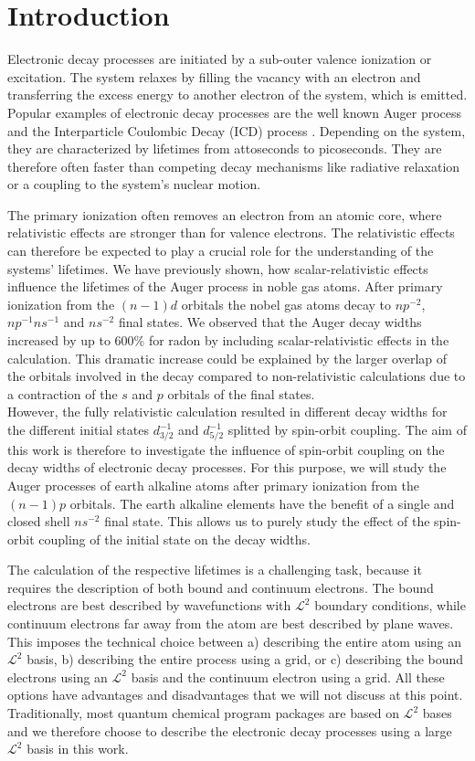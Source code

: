\section{Introduction}
Electronic decay processes are initiated by a sub-outer valence ionization
or excitation. The system relaxes by filling the vacancy with an electron and
transferring the excess energy to another electron of the system, which is emitted.
Popular examples of electronic decay processes are the
well known Auger process \cite{Meitner22} and the Interparticle
Coulombic Decay (ICD) process \cite{Cederbaum97}.
Depending on the system, they are characterized by lifetimes from attoseconds
to picoseconds. They are therefore often faster than competing decay mechanisms
like radiative relaxation or a coupling to the system's nuclear motion.

The primary ionization often removes an electron from an atomic core, where
relativistic effects are stronger than for valence electrons. The relativistic
effects can therefore be expected to play a crucial role for the understanding
of the systems' lifetimes. We have previously shown, how
scalar-relativistic effects influence the lifetimes of the Auger process in
noble gas atoms. After primary ionization from the $(n-1)d$ orbitals the nobel
gas atoms decay to $np^{-2}$, $np^{-1}ns^{-1}$ and $ns^{-2}$ final states.
We observed that the Auger decay widths increased by up to 600\% for radon
by including scalar-relativistic effects in the calculation. This
dramatic increase could be explained by the larger overlap of the orbitals
involved in the decay compared to non-relativistic calculations due to
a contraction of the $s$ and $p$ orbitals of the final states.\\
However, the fully relativistic calculation resulted in different decay widths
for the different initial states $d_{3/2}^{-1}$ and $d_{5/2}^{-1}$ splitted by
spin-orbit coupling. The aim of this work is therefore to investigate the
influence of spin-orbit coupling on the decay widths of electronic decay processes.
For this purpose, we will study the Auger processes of earth alkaline atoms
after primary ionization from the $(n-1)p$ orbitals. The earth alkaline elements
have the benefit of a single and closed shell $ns^{-2}$ final state.
This allows us to purely study the effect of the spin-orbit coupling of the
initial state on the decay widths.

The calculation of the respective lifetimes is a challenging task, because it
requires the description of both bound and continuum electrons. The bound electrons
are best described by wavefunctions with $\mathcal{L}^2$ boundary conditions,
while continuum electrons far away from the atom are best described by
plane waves. This imposes the technical choice between a) describing the entire
atom using an $\mathcal{L}^2$ basis, b) describing the entire process using
a grid, or c) describing the bound electrons using an $\mathcal{L}^2$ basis
and the continuum electron using a grid. All these options have advantages and
disadvantages that we will not discuss at this point. Traditionally, most quantum
chemical program packages are based on $\mathcal{L}^2$ bases and we therefore
choose to describe the electronic decay processes using a large $\mathcal{L}^2$
basis in this work.

